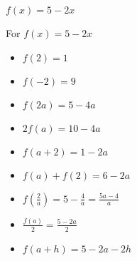 {$f(x) = 5-2x$}
{\item For $f(x) = 5-2x$


\begin{itemize}
\item  $f(2) = 1$
\item  $f(-2) = 9$
\item  $f(2a) = 5-4a$
\item  $2 f(a) = 10-4a$
\item $f(a+2) = 1-2a$
\item $f(a) + f(2) = 6-2a$
\item  $f \left( \frac{2}{a} \right) = 5 - \frac{4}{a} = \frac{5a-4}{a}$
\item $\frac{f(a)}{2} = \frac{5-2a}{2}$
\item  $f(a + h) = 5-2a-2h$
\end{itemize}
}